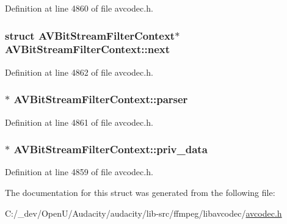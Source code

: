 Definition at line 4860 of file avcodec.\+h.

\subsubsection[{\texorpdfstring{next}{next}}]{\setlength{\rightskip}{0pt plus 5cm}struct {\bf A\+V\+Bit\+Stream\+Filter\+Context}$\ast$ A\+V\+Bit\+Stream\+Filter\+Context\+::next}\hypertarget{struct_a_v_bit_stream_filter_context_a65bd58b3ccc448c497f69c413c2703b6}{}\label{struct_a_v_bit_stream_filter_context_a65bd58b3ccc448c497f69c413c2703b6}


Definition at line 4862 of file avcodec.\+h.

\subsubsection[{\texorpdfstring{parser}{parser}}]{$\ast$ A\+V\+Bit\+Stream\+Filter\+Context\+::parser}\hypertarget{struct_a_v_bit_stream_filter_context_aef526b29a519eff27dc47d0d2fb31157}{}\label{struct_a_v_bit_stream_filter_context_aef526b29a519eff27dc47d0d2fb31157}


Definition at line 4861 of file avcodec.\+h.

\subsubsection[{\texorpdfstring{priv\+\_\+data}{priv_data}}]{$\ast$ A\+V\+Bit\+Stream\+Filter\+Context\+::priv\+\_\+data}\hypertarget{struct_a_v_bit_stream_filter_context_a52be23186f336ec2dabea3ff06b2c28d}{}\label{struct_a_v_bit_stream_filter_context_a52be23186f336ec2dabea3ff06b2c28d}


Definition at line 4859 of file avcodec.\+h.



The documentation for this struct was generated from the following file\+:\begin{DoxyCompactItemize}
\item 
C\+:/\+\_\+dev/\+Open\+U/\+Audacity/audacity/lib-\/src/ffmpeg/libavcodec/\hyperlink{avcodec_8h}{avcodec.\+h}\end{DoxyCompactItemize}
